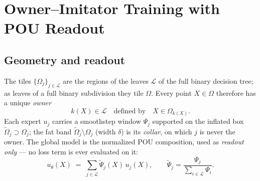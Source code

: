\documentclass[11pt]{article}
\begin{document}
\section*{Owner--Imitator Training with POU Readout}

\subsection*{Geometry and readout}
The tiles $\{\Omega_j\}_{j\in\mathcal L}$ are the regions of the leaves
$\mathcal L$ of the full binary decision tree; as leaves of a full
binary subdivision they tile $\Omega$. Every point $X \in \Omega$
therefore has a unique \emph{owner}
\begin{equation}
k(X) \in \mathcal L
\quad\text{defined by}\quad
X \in \Omega_{k(X)} .
\end{equation}
Each expert $u_j$ carries a smoothstep window $\Psi_j$ supported on the
inflated box $\widetilde\Omega_j \supset \Omega_j$; the fat band
$\widetilde\Omega_j \setminus \Omega_j$ (width $\delta$) is its
\emph{collar}, on which $j$ is never the owner. The global model is the
normalized POU composition, used as \emph{readout only} --- no loss term
is ever evaluated on it:
\begin{equation}
u_\theta(X) \;=\; \sum_{j\in\mathcal L} \tilde\Psi_j(X)\, u_j(X),
\qquad
\tilde\Psi_j = \frac{\Psi_j}{\sum_{i\in\mathcal L}\Psi_i}.
\label{eq:comp}
\end{equation}
\end{document}
